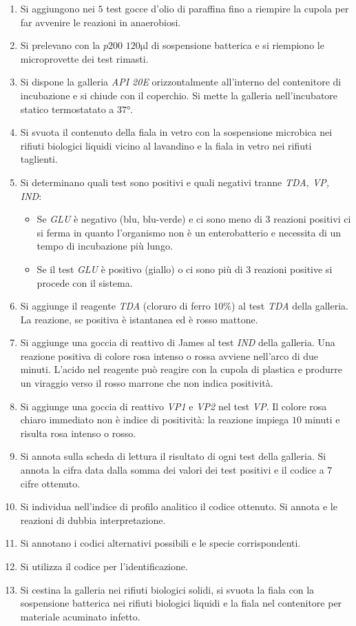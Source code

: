 \begin{enumerate}
			\item Si aggiungono nei $5$ test gocce d'olio di paraffina fino a riempire la cupola per far avvenire le reazioni in anaerobiosi.
			\item Si prelevano con la $p200$ $120\si{\micro\litre}$ di sospensione batterica e si riempiono le microprovette dei test rimasti.
			\item Si dispone la galleria \emph{API 20E} orizzontalmente all'interno del contenitore di incubazione e si chiude con il coperchio.
				Si mette la galleria nell'incubatore statico termostatato a $37\si{\degree}$.
			\item Si svuota il contenuto della fiala in vetro con la sospensione microbica nei rifiuti biologici liquidi vicino al lavandino e la fiala in vetro nei rifiuti taglienti.
			\item Si determinano quali test sono positivi e quali negativi tranne \emph{TDA, VP, IND}:
				\begin{itemize}
					\item Se \emph{GLU} \`e negativo (blu, blu-verde) e ci sono meno di $3$ reazioni positivi ci si ferma in quanto l'organismo non \`e un enterobatterio e necessita di un tempo di incubazione pi\`u lungo.
					\item Se il test \emph{GLU} \`e positivo (giallo) o ci sono pi\`u di $3$ reazioni positive si procede con il sistema.
				\end{itemize}
			\item Si aggiunge il reagente \emph{TDA} (cloruro di ferro $10\%$) al test \emph{TDA} della galleria.
				La reazione, se positiva \`e istantanea ed \`e rosso mattone.
			\item Si aggiunge una goccia di reattivo di James al test \emph{IND} della galleria.
				Una reazione positiva di colore rosa intenso o rossa avviene nell'arco di due minuti.
				L'acido nel reagente pu\`o reagire con la cupola di plastica e produrre un viraggio verso il rosso marrone che non indica positivit\`a.
			\item Si aggiunge una goccia di reattivo \emph{VP1} e \emph{VP2} nel test \emph{VP}.
				Il colore rosa chiaro immediato non \`e indice di positivit\`a: la reazione impiega $10$ minuti e risulta rosa intenso o rosso.
			\item Si annota sulla scheda di lettura il risultato di ogni test della galleria.
				Si annota la cifra data dalla somma dei valori dei test positivi e il codice a $7$ cifre ottenuto.
			\item Si individua nell'indice di profilo analitico il codice ottenuto.
				Si annota e le reazioni di dubbia interpretazione.
			\item Si annotano i codici alternativi possibili e le specie corrispondenti.
			\item Si utilizza il codice per l'identificazione.
			\item Si cestina la galleria nei rifiuti biologici solidi, si svuota la fiala con la sospensione batterica nei rifiuti biologici liquidi e la fiala nel contenitore per materiale acuminato infetto.
		\end{enumerate}

